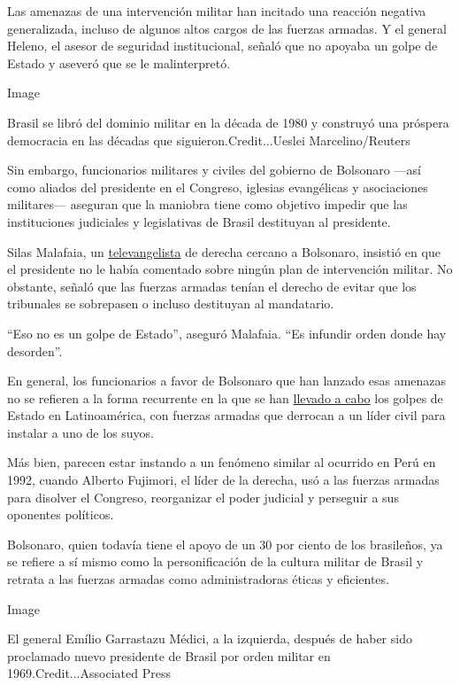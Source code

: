 Las amenazas de una intervención militar han incitado una reacción
negativa generalizada, incluso de algunos altos cargos de las fuerzas
armadas. Y el general Heleno, el asesor de seguridad institucional,
señaló que no apoyaba un golpe de Estado y aseveró que se le
malinterpretó.

Image

Brasil se libró del dominio militar en la década de 1980 y construyó una
próspera democracia en las décadas que siguieron.Credit...Ueslei
Marcelino/Reuters

Sin embargo, funcionarios militares y civiles del gobierno de Bolsonaro
---así como aliados del presidente en el Congreso, iglesias evangélicas
y asociaciones militares--- aseguran que la maniobra tiene como objetivo
impedir que las instituciones judiciales y legislativas de Brasil
destituyan al presidente.

Silas Malafaia, un
\href{https://www.nytimes3xbfgragh.onion/2011/11/26/world/americas/silas-malafaia-tv-evangelist-rises-in-brazils-culture-wars.html}{televangelista}
de derecha cercano a Bolsonaro, insistió en que el presidente no le
había comentado sobre ningún plan de intervención militar. No obstante,
señaló que las fuerzas armadas tenían el derecho de evitar que los
tribunales se sobrepasen o incluso destituyan al mandatario.

``Eso no es un golpe de Estado'', aseguró Malafaia. ``Es infundir orden
donde hay desorden''.

En general, los funcionarios a favor de Bolsonaro que han lanzado esas
amenazas no se refieren a la forma recurrente en la que se han
\href{https://www.nytimes3xbfgragh.onion/2011/10/21/world/americas/an-apology-for-a-guatemalan-coup-57-years-later.html}{llevado
a cabo} los golpes de Estado en Latinoamérica, con fuerzas armadas que
derrocan a un líder civil para instalar a uno de los suyos.

Más bien, parecen estar instando a un fenómeno similar al ocurrido en
Perú en 1992, cuando Alberto Fujimori, el líder de la derecha, usó a las
fuerzas armadas para disolver el Congreso, reorganizar el poder judicial
y perseguir a sus oponentes políticos.

Bolsonaro, quien todavía tiene el apoyo de un 30 por ciento de los
brasileños, ya se refiere a sí mismo como la personificación de la
cultura militar de Brasil y retrata a las fuerzas armadas como
administradoras éticas y eficientes.

Image

El general Emílio Garrastazu Médici, a la izquierda, después de haber
sido proclamado nuevo presidente de Brasil por orden militar en
1969.Credit...Associated Press


